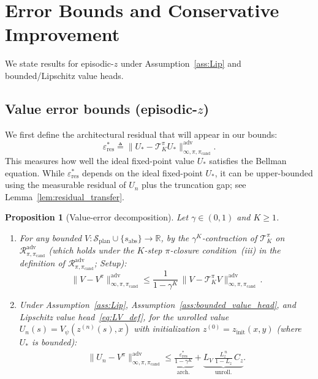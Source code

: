\documentclass{article}
\theoremstyle{plain}
\newtheorem{proposition}[theorem]{Proposition}
\theoremstyle{definition}
\theoremstyle{remark}
\newcommand{\longonly}[1]{}
\newcommand{\longonly}[1]{#1}
\newcommand{\R}{\mathbb{R}}
\newcommand{\SSS}{\mathcal{S}}
\begin{document}
\section{Error Bounds and Conservative Improvement}
\label{sec:error_bounds}

We state results for episodic-$z$ under Assumption~\ref{ass:Lip} and bounded/Lipschitz value heads.

\subsection{Value error bounds (episodic-$z$)}
\label{sec:value_error_bounds}

We first define the architectural residual that will appear in our bounds:
\begin{equation}
\varepsilon_{\mathrm{res}}^* \triangleq \|U_* - \mathcal{T}^\pi_K U_*\|_{\infty,\pi,\pi_{\mathrm{cand}}}^{\mathrm{adv}}.
\label{eq:eps_res_def}
\end{equation}
This measures how well the ideal fixed-point value $U_*$ satisfies the Bellman equation.
While $\varepsilon_{\mathrm{res}}^*$ depends on the ideal fixed-point $U_*$, it can be upper-bounded using the measurable residual of $U_n$ plus the truncation gap; see Lemma~\ref{lem:residual_transfer}.

\begin{proposition}[Value-error decomposition]
\label{prop:error_bounds}
Let $\gamma\in(0,1)$ and $K\ge 1$.
\begin{enumerate}
\item For any bounded $V:\SSS_{\mathrm{plan}}\cup\{s_{\mathrm{abs}}\}\to\R$, by the $\gamma^K$-contraction of $\mathcal{T}^\pi_K$ on $\mathcal{R}^{\mathrm{adv}}_{\pi,\pi_{\mathrm{cand}}}$ (which holds under the $K$-step $\pi$-closure condition~(iii) in the definition of $\mathcal{R}^{\mathrm{adv}}_{\pi,\pi_{\mathrm{cand}}}$; Setup\longonly{, Lemma~\ref{lem:Kstep_contraction}}):
\begin{equation}
\|V - V^\pi\|_{\infty,\pi,\pi_{\mathrm{cand}}}^{\mathrm{adv}}
\le
\frac{1}{1-\gamma^K}\,
\|V-\mathcal{T}^\pi_K V\|_{\infty,\pi,\pi_{\mathrm{cand}}}^{\mathrm{adv}}\,.
\label{eq:boundA}
\end{equation}
\item Under Assumption~\ref{ass:Lip}, Assumption~\ref{ass:bounded_value_head}, and Lipschitz value head~\eqref{eq:LV_def}, for the unrolled value $U_n(s)=V_\psi(z^{(n)}(s),x)$ with initialization $z^{(0)} = z_{\mathrm{init}}(x,y)$ (where $U_*$ is bounded):
\begin{align}
\|U_n - V^\pi\|_{\infty,\pi,\pi_{\mathrm{cand}}}^{\mathrm{adv}}
\le
\underbrace{\frac{\varepsilon_{\mathrm{res}}^*}{1-\gamma^K}}_{\text{arch.}}
+
\underbrace{L_V\,\frac{L_z^{\,n}}{1-L_z}\,C_z}_{\text{unroll.}}.
\label{eq:epsV_dials}
\end{align}
\end{enumerate}
\end{proposition}
\end{document}
